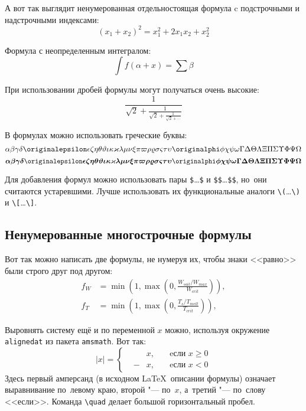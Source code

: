 А вот так выглядит ненумерованная отдельностоящая формула c подстрочными
и надстрочными индексами:
\[
    (x_1+x_2)^2 = x_1^2 + 2 x_1 x_2 + x_2^2
\]

Формула с неопределенным интегралом:
\[
    \int f(\alpha+x)=\sum\beta
\]

При использовании дробей формулы могут получаться очень высокие:
\[
    \frac{1}{\sqrt{2}+
        \displaystyle\frac{1}{\sqrt{2}+
            \displaystyle\frac{1}{\sqrt{2}+\cdots}}}
\]

В формулах можно использовать греческие буквы:
\[
    \alpha\beta\gamma\delta\originalepsilon\epsilon\zeta\eta\theta%
    \vartheta\iota\kappa\varkappa\lambda\mu\nu\xi\pi\varpi\rho\varrho%
    \sigma\varsigma\tau\upsilon\originalphi\phi\chi\psi\omega\Gamma\Delta%
    \Theta\Lambda\Xi\Pi\Sigma\Upsilon\Phi\Psi\Omega
\]
\[%
    \boldsymbol{\alpha\beta\gamma\delta\originalepsilon\epsilon\zeta\eta%
        \theta\vartheta\iota\kappa\varkappa\lambda\mu\nu\xi\pi\varpi\rho%
        \varrho\sigma\varsigma\tau\upsilon\originalphi\phi\chi\psi\omega\Gamma%
        \Delta\Theta\Lambda\Xi\Pi\Sigma\Upsilon\Phi\Psi\Omega}
\]

Для добавления формул можно использовать пары \verb+$+\dots\verb+$+ и \verb+$$+\dots\verb+$$+,
но~они считаются устаревшими.
Лучше использовать их функциональные аналоги \verb+\(+\dots\verb+\)+ и \verb+\[+\dots\verb+\]+.

\subsection{Ненумерованные многострочные формулы}\label{subsec:ch1/sec3/sub2}

Вот так можно написать две формулы, не нумеруя их, чтобы знаки <<равно>> были
строго друг под другом:
\begin{align}
    f_W & =  \min \left( 1, \max \left( 0, \frac{W_{soil} / W_{max}}{W_{crit}} \right)  \right), \nonumber \\
    f_T & =  \min \left( 1, \max \left( 0, \frac{T_s / T_{melt}}{T_{crit}} \right)  \right), \nonumber
\end{align}

Выровнять систему ещё и по переменной \( x \) можно, используя окружение
\verb|alignedat| из пакета \verb|amsmath|. Вот так:
\[
|x| = \left\{
\begin{alignedat}{2}
     &   & x, \quad & \text{eсли } x\geqslant 0 \\
     & - & x, \quad & \text{eсли } x<0
\end{alignedat}
\right.
\]
Здесь первый амперсанд (в исходном \LaTeX\ описании формулы) означает
выравнивание по~левому краю, второй "--- по~\( x \), а~третий "--- по~слову
<<если>>. Команда \verb|\quad| делает большой горизонтальный пробел.

